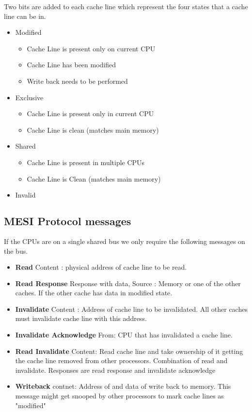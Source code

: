 \documentclass{article}
\begin{document}
Two bits are added to each cache line which represent the four states
that a cache line can be in.

\begin{itemize}
\item Modified
  \begin{itemize}
    \item Cache Line is present only on current CPU
    \item Cache Line has been modified
    \item Write back needs to be performed
  \end{itemize}


\item Exclusive
    \begin{itemize}
    \item Cache Line is present only in current CPU
    \item Cache Line is clean (matches main memory)
    \end{itemize}
    
  \item Shared
    \begin{itemize}
    \item Cache Line is present in multiple CPUs
    \item Cache Line is Clean (matches main memory)
    \end{itemize}
  \item Invalid 
\end{itemize}

\subsection{MESI Protocol messages}

If the CPUs are on a single shared bus we only require the following
messages on the bus.

\begin{itemize}
\item \textbf{Read} Content : physical address of cache line to be
  read.
\item \textbf{Read Response} Response with data, Source : Memory or
  one of the other caches. If the other cache has data in modified
  state.
\item \textbf{Invalidate} Content : Address of cache line to be
  invalidated. All other caches must invalidate cache line with this
  address.

\item \textbf{Invalidate Acknowledge} From: CPU that has invalidated a
  cache line.

\item \textbf{Read Invalidate} Content: Read cache line and take
  ownership of it getting the cache line removed from other
  processors. Combination of read and invalidate. Responses are read
  response and invalidate acknowledge

\item \textbf{Writeback} contnet: Address of and data of write back to
  memory. This message might get snooped by other processors to mark
  cache lines as "modified"  
\end{itemize}
\end{document}
